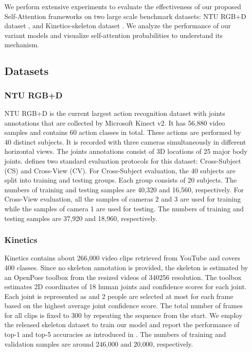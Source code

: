 \documentclass[10pt,twocolumn,letterpaper]{article}
\begin{document}
We perform extensive experiments to evaluate the effectiveness of our proposed Self-Attention frameworks on two large scale benchmark datasets: NTU RGB+D dataset \cite{data:NTUD}, and Kinetics-skeleton dataset \cite{data:Kinetics}. We analyze the performance of our variant models and visualize self-attention probabilities to understand its mechanism.
\subsection{Datasets}
\subsubsection{NTU RGB+D}
NTU RGB+D is the current largest action recognition dataset with joints annotations that are collected by Microsoft Kinect v2. It has 56,880 video samples and contains 60 action classes in total. These actions are performed by 40 distinct subjects. It is recorded with three cameras simultaneously in different horizontal views. The joints annotations consist of 3D locations of 25 major body joints. \cite{data:NTUD} defines two standard evaluation protocols for this dataset: Cross-Subject (CS) and Cross-View (CV). For Cross-Subject evaluation, the 40 subjects are split into training and testing groups. Each group consists of 20 subjects. The numbers of training and testing samples are 40,320 and 16,560, respectively. For Cross-View evaluation, all the samples of cameras 2 and 3 are used for training while the samples of camera 1 are used for testing. The numbers of training and testing samples are 37,920 and 18,960, respectively.
\subsubsection{Kinetics}
Kinetics \cite{data:Kinetics} contains about 266,000 video clips retrieved from YouTube and covers 400 classes. 
Since no skeleton annotation is provided, the skeleton is estimated by an OpenPose toolbox \cite{data:Openpose} from the resized videos of 340256 resolution.
The toolbox estimates 2D coordinates  of 18 human joints and confidence scores  for each joint. Each joint is represented as  and 2 people are selected at most for each frame based on the highest average joint confidence score. The total number of frames for all clips is fixed to 300 by repeating the sequence from the start.
We employ the released skeleton dataset to train our model and report the performance of top-1 and top-5 accuracies as introduced in \cite{STOA:stgcn}. The numbers of training and validation samples are around 246,000 and 20,000, respectively. 
\end{document}
